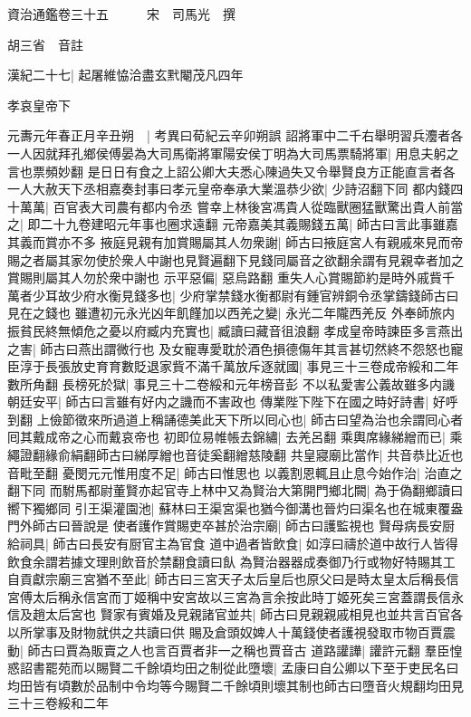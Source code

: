 資治通鑑卷三十五　　　宋　司馬光　撰

胡三省　音註

漢紀二十七|{
	起屠維恊洽盡玄黓閹茂凡四年}


孝哀皇帝下

元夀元年春正月辛丑朔　|{
	考異曰荀紀云辛卯朔誤}
詔將軍中二千右舉明習兵灋者各一人因就拜孔鄉侯傅晏為大司馬衛將軍陽安侯丁明為大司馬票騎將軍|{
	用息夫躬之言也票頻妙翻}
是日日有食之上詔公卿大夫悉心陳過失又令舉賢良方正能直言者各一人大赦天下丞相嘉奏封事曰孝元皇帝奉承大業溫恭少欲|{
	少詩沼翻下同}
都内錢四十萬萬|{
	百官表大司農有都内令丞}
嘗幸上林後宮馮貴人從臨獸圈猛獸驚出貴人前當之|{
	即二十九卷建昭元年事也圈求遠翻}
元帝嘉美其義賜錢五萬|{
	師古曰言此事雖嘉其義而賞亦不多}
掖庭見親有加賞賜屬其人勿衆謝|{
	師古曰掖庭宮人有親戚來見而帝賜之者屬其家勿使於衆人中謝也見賢遍翻下見錢同屬音之欲翻余謂有見親幸者加之賞賜則屬其人勿於衆中謝也}
示平惡偏|{
	惡烏路翻}
重失人心賞賜節約是時外戚貲千萬者少耳故少府水衡見錢多也|{
	少府掌禁錢水衡都尉有鍾官辨銅令丞掌鑄錢師古曰見在之錢也}
雖遭初元永光凶年飢饉加以西羌之變|{
	永光二年隴西羌反}
外奉師旅内振貧民終無傾危之憂以府臧内充實也|{
	臧讀曰藏音徂浪翻}
孝成皇帝時諫臣多言燕出之害|{
	師古曰燕出謂微行也}
及女寵專愛耽於酒色損德傷年其言甚切然終不怨怒也寵臣淳于長張放史育育數貶退家貲不滿千萬放斥逐就國|{
	事見三十三卷成帝綏和二年數所角翻}
長榜死於獄|{
	事見三十二卷綏和元年榜音彭}
不以私愛害公義故雖多内譏朝廷安平|{
	師古曰言雖有好内之譏而不害政也}
傳業陛下陛下在國之時好詩書|{
	好呼到翻}
上儉節徵來所過道上稱誦德美此天下所以囘心也|{
	師古曰望為治也余謂囘心者囘其戴成帝之心而戴哀帝也}
初即位易帷帳去錦繡|{
	去羌呂翻}
乘輿席緣綈繒而已|{
	乘繩證翻緣俞絹翻師古曰綈厚繒也音徒奚翻繒慈陵翻}
共皇寢廟比當作|{
	共音恭比近也音毗至翻}
憂閔元元惟用度不足|{
	師古曰惟思也}
以義割恩輒且止息今始作治|{
	治直之翻下同}
而駙馬都尉董賢亦起官寺上林中又為賢治大第開門鄉北闕|{
	為于偽翻鄉讀曰嚮下獨鄉同}
引王渠灌園池|{
	蘇林曰王渠宮渠也猶今御溝也晉灼曰渠名也在城東覆盎門外師古曰晉說是}
使者護作賞賜吏卒甚於治宗廟|{
	師古曰護監視也}
賢母病長安厨給祠具|{
	師古曰長安有厨官主為官食}
道中過者皆飲食|{
	如淳曰禱於道中故行人皆得飲食余謂若據文理則飲音於禁翻食讀曰飤}
為賢治器器成奏御乃行或物好特賜其工自貢獻宗廟三宮猶不至此|{
	師古曰三宮天子太后皇后也原父曰是時太皇太后稱長信宮傅太后稱永信宮而丁姬稱中安宮故以三宮為言余按此時丁姬死矣三宮蓋謂長信永信及趙太后宮也}
賢家有賓婚及見親諸官並共|{
	師古曰見親親戚相見也並共言百官各以所掌事及財物就供之共讀曰供}
賜及倉頭奴婢人十萬錢使者護視發取市物百賈震動|{
	師古曰賈為販賣之人也言百賈者非一之稱也賈音古}
道路讙譁|{
	讙許元翻}
羣臣惶惑詔書罷苑而以賜賢二千餘頃均田之制從此墮壞|{
	孟康曰自公卿以下至于吏民名曰均田皆有頃數於品制中令均等今賜賢二千餘頃則壞其制也師古曰墮音火規翻均田見三十三卷綏和二年}
